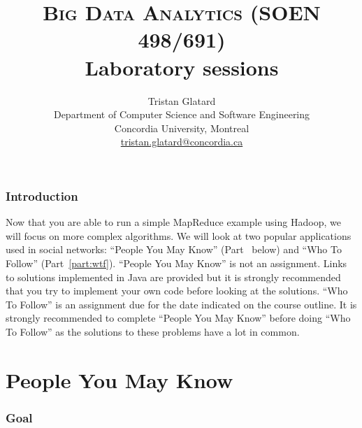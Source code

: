 \documentclass[11pt]{article}
\title{\textsc{Big Data Analytics (SOEN 498/691)} \\ Laboratory sessions}
\author{Tristan Glatard\\Department of Computer Science and Software Engineering\\Concordia University, Montreal\\\href{mailto:tristan.glatard@concordia.ca}{tristan.glatard@concordia.ca}}
\begin{document}
\maketitle

\newpage

\tableofcontents

\newpage

\section{Introduction}

Now that you are able to run a simple MapReduce example using Hadoop,
we will focus on more complex algorithms. We will look at two popular
applications used in social networks: ``People You May Know''
(Part~\ref{part:pymk} below) and ``Who To Follow''
(Part~\ref{part:wtf}).  ``People You May Know'' is not an
assignment. Links to solutions implemented in Java are provided but it
is strongly recommended that you try to implement your own code before
looking at the solutions. ``Who To Follow'' is an assignment due for
the date indicated on the course outline. It is strongly recommended
to complete ``People You May Know'' before doing ``Who To Follow'' as
the solutions to these problems have a lot in common.

\part{People You May Know}
\label{part:pymk}

\section{Goal}
\end{document}
